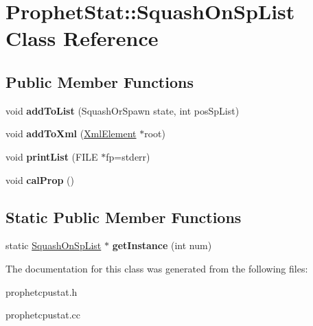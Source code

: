 \hypertarget{classProphetStat_1_1SquashOnSpList}{
\section{ProphetStat::SquashOnSpList Class Reference}
\label{classProphetStat_1_1SquashOnSpList}
}
\subsection*{Public Member Functions}
\begin{DoxyCompactItemize}
\item 
\hypertarget{classProphetStat_1_1SquashOnSpList_a83814cf7d6a2590cdf55d7ba913f6aab}{
void {\bfseries addToList} (SquashOrSpawn state, int posSpList)}
\label{classProphetStat_1_1SquashOnSpList_a83814cf7d6a2590cdf55d7ba913f6aab}

\item 
\hypertarget{classProphetStat_1_1SquashOnSpList_a94b56064cbc458c271b2494bb437b082}{
void {\bfseries addToXml} (\hyperlink{classXmlElement}{XmlElement} $\ast$root)}
\label{classProphetStat_1_1SquashOnSpList_a94b56064cbc458c271b2494bb437b082}

\item 
\hypertarget{classProphetStat_1_1SquashOnSpList_a4bffc14013536873a62dd0f98d4d69e8}{
void {\bfseries printList} (FILE $\ast$fp=stderr)}
\label{classProphetStat_1_1SquashOnSpList_a4bffc14013536873a62dd0f98d4d69e8}

\item 
\hypertarget{classProphetStat_1_1SquashOnSpList_aceea97fb1e7f46c34fa46fecbfdb7922}{
void {\bfseries calProp} ()}
\label{classProphetStat_1_1SquashOnSpList_aceea97fb1e7f46c34fa46fecbfdb7922}

\end{DoxyCompactItemize}
\subsection*{Static Public Member Functions}
\begin{DoxyCompactItemize}
\item 
\hypertarget{classProphetStat_1_1SquashOnSpList_a7ab26166ecb4d874d08b565c287e7124}{
static \hyperlink{classProphetStat_1_1SquashOnSpList}{SquashOnSpList} $\ast$ {\bfseries getInstance} (int num)}
\label{classProphetStat_1_1SquashOnSpList_a7ab26166ecb4d874d08b565c287e7124}

\end{DoxyCompactItemize}


The documentation for this class was generated from the following files:\begin{DoxyCompactItemize}
\item 
prophetcpustat.h\item 
prophetcpustat.cc\end{DoxyCompactItemize}
